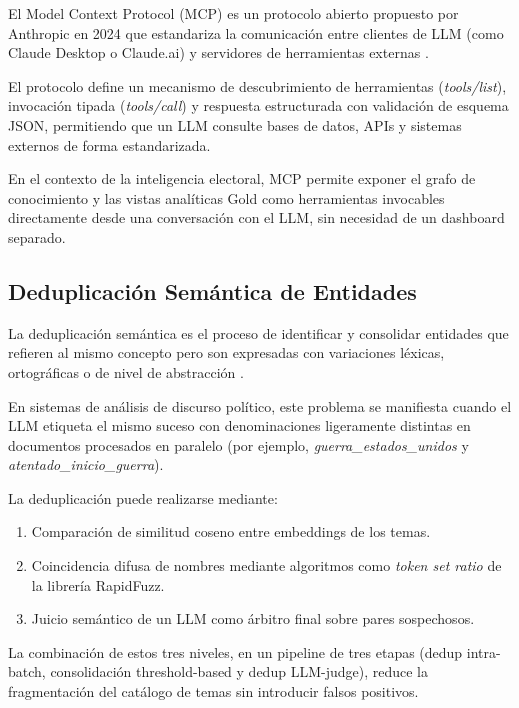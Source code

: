 \documentclass[listof=nochaptergap,12pt,times,authoryear]{report}
\begin{document}
El Model Context Protocol (MCP) es un protocolo abierto propuesto por Anthropic en 2024 que estandariza la comunicación entre clientes de LLM (como Claude Desktop o Claude.ai) y servidores de herramientas externas \parencite{tec_anthropic2024mcp}.

El protocolo define un mecanismo de descubrimiento de herramientas (\textit{tools/list}), invocación tipada (\textit{tools/call}) y respuesta estructurada con validación de esquema JSON, permitiendo que un LLM consulte bases de datos, APIs y sistemas externos de forma estandarizada.

En el contexto de la inteligencia electoral, MCP permite exponer el grafo de conocimiento y las vistas analíticas Gold como herramientas invocables directamente desde una conversación con el LLM, sin necesidad de un dashboard separado.

\subsection{Deduplicación Semántica de Entidades}

La deduplicación semántica es el proceso de identificar y consolidar entidades que refieren al mismo concepto pero son expresadas con variaciones léxicas, ortográficas o de nivel de abstracción \parencite{tec_mudgal2018deepmatcher}.

En sistemas de análisis de discurso político, este problema se manifiesta cuando el LLM etiqueta el mismo suceso con denominaciones ligeramente distintas en documentos procesados en paralelo (por ejemplo, \textit{guerra\_estados\_unidos} y \textit{atentado\_inicio\_guerra}).

La deduplicación puede realizarse mediante:
\begin{enumerate}
    \item Comparación de similitud coseno entre embeddings de los temas.
    \item Coincidencia difusa de nombres mediante algoritmos como \textit{token set ratio} de la librería RapidFuzz.
    \item Juicio semántico de un LLM como árbitro final sobre pares sospechosos.
\end{enumerate}

La combinación de estos tres niveles, en un pipeline de tres etapas (dedup intra-batch, consolidación threshold-based y dedup LLM-judge), reduce la fragmentación del catálogo de temas sin introducir falsos positivos.
\end{document}
